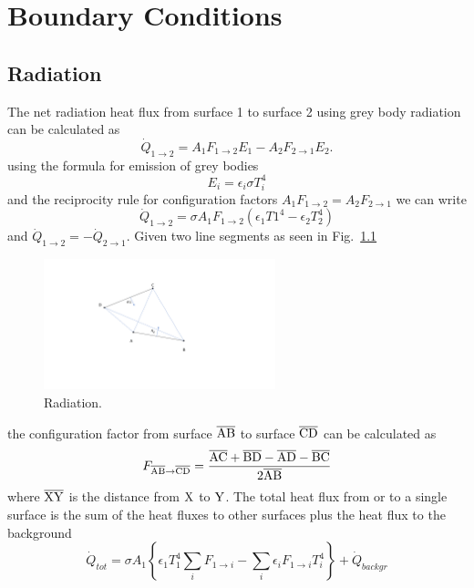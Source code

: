 \chapter{Boundary Conditions}

\section{Radiation}
The net radiation heat flux from surface 1 to surface 2 using grey body radiation can be calculated as 
\begin{equation}
	\dot{Q}_{1 \rightarrow 2} = A_1 F_{1 \rightarrow 2} E_1 -  A_2 F_{2 \rightarrow 1} E_2.
\end{equation}
using the formula for emission of grey bodies
\begin{equation}
	E_i = \epsilon_i \sigma T_i^4 
\end{equation}
and the reciprocity rule for configuration factors $A_1 F_{1 \rightarrow 2} = A_2 F_{2 \rightarrow 1}$ we can write
\begin{equation}
	\dot{Q}_{1 \rightarrow 2} = \sigma A_1 F_{1 \rightarrow 2} \left(\epsilon_1 T1^4 - \epsilon_2 T_2^4\right)
\end{equation}
and $\dot{Q}_{1 \rightarrow 2} = -\dot{Q}_{2 \rightarrow 1}$.
Given two line segments as seen in Fig.~\ref{fig:radiation}
\begin{figure}[H]
	\centering
	\includegraphics[trim= 8cm 5cm 13cm 3.5cm ,clip,width=0.6\textwidth]{figures/radiation.png}
	\caption{Radiation.}
	\label{fig:radiation}
\end{figure}
the configuration factor from surface $\overline{\mathrm{AB}}$ to surface $\overline{\mathrm{CD}}$ can be calculated as
\begin{equation}
	F_{\overline{\mathrm{AB}} \rightarrow \overline{\mathrm{CD}}} = \frac{\overline{\mathrm{AC}} + \overline{\mathrm{BD}} - \overline{\mathrm{AD}} - \overline{\mathrm{BC}}}{2 \overline{\mathrm{AB}}}
\end{equation}
where $\overline{\mathrm{XY}}$ is the distance from $\mathrm{X}$ to $\mathrm{Y}$.
The total heat flux from or to a single surface is the sum of the heat fluxes to other surfaces plus the heat flux to the background
\begin{equation}
	\dot{Q}_{tot} = \sigma A_1 \left\{\epsilon_1 T_1^4 \sum_i F_{1 \rightarrow i} - \sum_i \epsilon_i F_{1 \rightarrow i}  T_i^4 \right\} + \dot{Q}_{backgr}
\end{equation}

